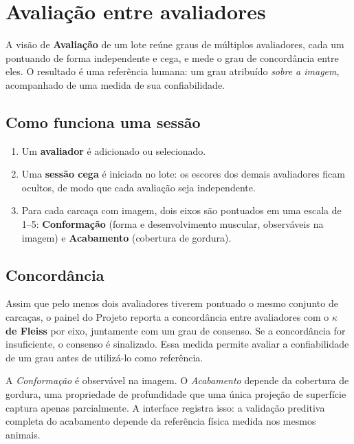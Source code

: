 \chapter{Avaliação entre avaliadores}


\vspace{4pt}
A visão de \textbf{Avaliação} de um lote reúne graus de múltiplos avaliadores, cada
um pontuando de forma independente e cega, e mede o grau de concordância entre eles.
O resultado é uma referência humana: um grau atribuído \emph{sobre a imagem},
acompanhado de uma medida de sua confiabilidade.

\section{Como funciona uma sessão}

\begin{enumerate}[leftmargin=1.4em,itemsep=3pt]
  \item Um \textbf{avaliador} é adicionado ou selecionado.
  \item Uma \textbf{sessão cega} é iniciada no lote: os escores dos demais avaliadores
        ficam ocultos, de modo que cada avaliação seja independente.
  \item Para cada carcaça com imagem, dois eixos são pontuados em uma escala de 1--5:
        \textbf{Conformação} (forma e desenvolvimento muscular, observáveis na
        imagem) e \textbf{Acabamento} (cobertura de gordura).
\end{enumerate}

\section{Concordância}

Assim que pelo menos dois avaliadores tiverem pontuado o mesmo conjunto de carcaças, o
painel do Projeto reporta a concordância entre avaliadores com o \textbf{$\kappa$ de Fleiss}
por eixo, juntamente com um grau de consenso. Se a concordância for insuficiente, o consenso
é sinalizado. Essa medida permite avaliar a confiabilidade de um grau antes de utilizá-lo
como referência.

\begin{note}[title={Dois eixos, duas confianças diferentes}]
A \emph{Conformação} é observável na imagem. O \emph{Acabamento} depende da cobertura
de gordura, uma propriedade de profundidade que uma única projeção de superfície captura apenas
parcialmente. A interface registra isso: a validação preditiva completa do acabamento depende
da referência física medida nos mesmos animais.
\end{note}
